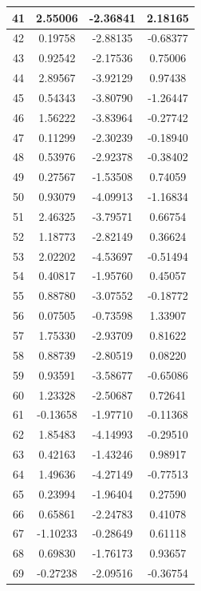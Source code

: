\documentclass[14pt,a4paper]{scrartcl}
\begin{document}
\begin{table}[ht]
	\centering
	\begin{tabular}{|c||c||c||c|}
		41 & 2.55006 & -2.36841 & 2.18165 \\ 
	\hline
	42 & 0.19758 & -2.88135 & -0.68377 \\ 
	\hline
	43 & 0.92542 & -2.17536 & 0.75006 \\ 
	\hline
	44 & 2.89567 & -3.92129 & 0.97438 \\ 
	\hline
	45 & 0.54343 & -3.80790 & -1.26447 \\ 
	\hline
	46 & 1.56222 & -3.83964 & -0.27742 \\ 
	\hline
	47 & 0.11299 & -2.30239 & -0.18940 \\ 
	\hline
	48 & 0.53976 & -2.92378 & -0.38402 \\ 
	\hline
	49 & 0.27567 & -1.53508 & 0.74059 \\ 
	\hline
	50 & 0.93079 & -4.09913 & -1.16834 \\ 
	\hline
	51 & 2.46325 & -3.79571 & 0.66754 \\ 
	\hline
	52 & 1.18773 & -2.82149 & 0.36624 \\ 
	\hline
	53 & 2.02202 & -4.53697 & -0.51494 \\ 
	\hline
	54 & 0.40817 & -1.95760 & 0.45057 \\ 
	\hline
	55 & 0.88780 & -3.07552 & -0.18772 \\ 
	\hline
	56 & 0.07505 & -0.73598 & 1.33907 \\ 
	\hline
	57 & 1.75330 & -2.93709 & 0.81622 \\ 
	\hline
	58 & 0.88739 & -2.80519 & 0.08220 \\ 
	\hline
	59 & 0.93591 & -3.58677 & -0.65086 \\ 
	\hline
	60 & 1.23328 & -2.50687 & 0.72641 \\ 
	\hline
	61 & -0.13658 & -1.97710 & -0.11368 \\ 
	\hline
	62 & 1.85483 & -4.14993 & -0.29510 \\ 
	\hline
	63 & 0.42163 & -1.43246 & 0.98917 \\ 
	\hline
	64 & 1.49636 & -4.27149 & -0.77513 \\ 
	\hline
	65 & 0.23994 & -1.96404 & 0.27590 \\ 
	\hline
	66 & 0.65861 & -2.24783 & 0.41078 \\ 
	\hline
	67 & -1.10233 & -0.28649 & 0.61118 \\ 
	\hline
	68 & 0.69830 & -1.76173 & 0.93657 \\ 
	\hline
	69 & -0.27238 & -2.09516 & -0.36754 \\ 

\end{tabular}
\end{table}
\end{document}

